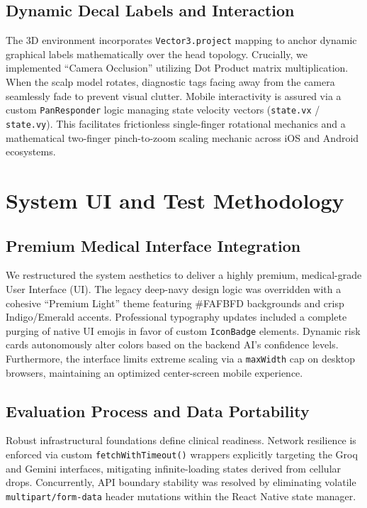 \documentclass[12pt, a4paper]{article}
\begin{document}
\subsection{Dynamic Decal Labels and Interaction}
The 3D environment incorporates \texttt{Vector3.project} mapping to anchor dynamic graphical labels mathematically over the head topology. Crucially, we implemented ``Camera Occlusion'' utilizing Dot Product matrix multiplication. When the scalp model rotates, diagnostic tags facing away from the camera seamlessly fade to prevent visual clutter. Mobile interactivity is assured via a custom \texttt{PanResponder} logic managing state velocity vectors (\texttt{state.vx} / \texttt{state.vy}). This facilitates frictionless single-finger rotational mechanics and a mathematical two-finger pinch-to-zoom scaling mechanic across iOS and Android ecosystems.

\section{System UI and Test Methodology}

\subsection{Premium Medical Interface Integration}
We restructured the system aesthetics to deliver a highly premium, medical-grade User Interface (UI). The legacy deep-navy design logic was overridden with a cohesive ``Premium Light'' theme featuring \#FAFBFD backgrounds and crisp Indigo/Emerald accents. Professional typography updates included a complete purging of native UI emojis in favor of custom \texttt{IconBadge} elements. Dynamic risk cards autonomously alter colors based on the backend AI's confidence levels. Furthermore, the interface limits extreme scaling via a \texttt{maxWidth} cap on desktop browsers, maintaining an optimized center-screen mobile experience.

\subsection{Evaluation Process and Data Portability}
Robust infrastructural foundations define clinical readiness. Network resilience is enforced via custom \texttt{fetchWithTimeout()} wrappers explicitly targeting the Groq and Gemini interfaces, mitigating infinite-loading states derived from cellular drops. Concurrently, API boundary stability was resolved by eliminating volatile \texttt{multipart/form-data} header mutations within the React Native state manager. 
\end{document}
